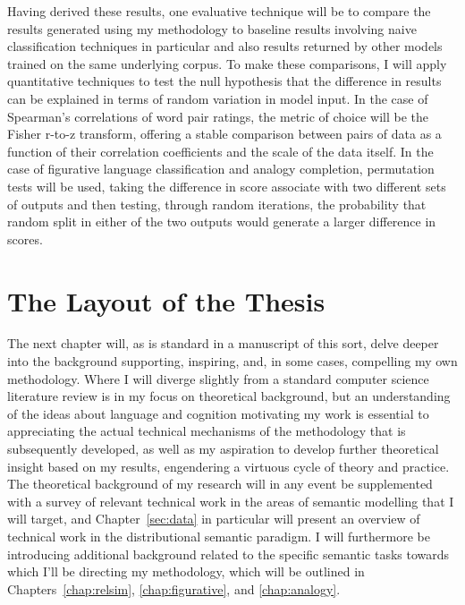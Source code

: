 Having derived these results, one evaluative technique will be to compare the results generated using my methodology to baseline results involving naive classification techniques in particular and also results returned by other models trained on the same underlying corpus.  To make these comparisons, I will apply quantitative techniques to test the null hypothesis that the difference in results can be explained in terms of random variation in model input.  In the case of Spearman's correlations of word pair ratings, the metric of choice will be the Fisher r-to-z transform, offering a stable comparison between pairs of data as a function of their correlation coefficients and the scale of the data itself.  In the case of figurative language classification and analogy completion, permutation tests will be used, taking the difference in score associate with two different sets of outputs and then testing, through random iterations, the probability that random split in either of the two outputs would generate a larger difference in scores.

\section{The Layout of the Thesis}
The next chapter will, as is standard in a manuscript of this sort, delve deeper into the background supporting, inspiring, and, in some cases, compelling my own methodology.  Where I will diverge slightly from a standard computer science literature review is in my focus on theoretical background, but an understanding of the ideas about language and cognition motivating my work is essential to appreciating the actual technical mechanisms of the methodology that is subsequently developed, as well as my aspiration to develop further theoretical insight based on my results, engendering a virtuous cycle of theory and practice.  The theoretical background of my research will in any event be supplemented with a survey of relevant technical work in the areas of semantic modelling that I will target, and Chapter~\ref{sec:data} in particular will present an overview of technical work in the distributional semantic paradigm.  I will furthermore be introducing additional background related to the specific semantic tasks towards which I'll be directing my methodology, which will be outlined in Chapters~\ref{chap:relsim}, \ref{chap:figurative}, and \ref{chap:analogy}.

